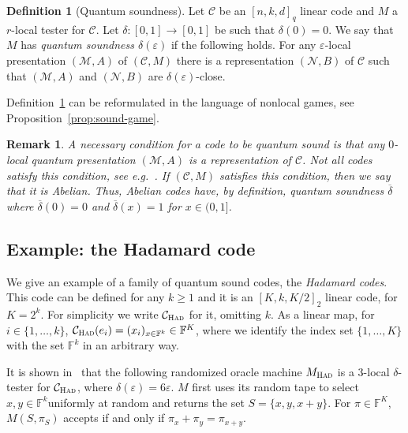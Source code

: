 \documentclass[11pt]{article}
\newtheorem{remark}[theorem]{Remark}
\theoremstyle{definition}
\newtheorem{definition}[theorem]{Definition}
\newcommand{\code}{\mathcal{C}}
\DeclareMathOperator*{\Expectation}{\mathbb{E}}
\newcommand{\Es}[1]{\Expectation_{#1}}
\newcommand{\field}{\mathbb{F}}
\newcommand{\mC}{\ensuremath{\mathcal{C}}}
\newcommand{\mM}{\ensuremath{\mathcal{M}}}
\newcommand{\had}{\textsc{Had}}
\newcommand{\eps}{\varepsilon}
\newcommand{\mN}{\mathcal{N}}
\begin{document}
\begin{definition}[Quantum soundness]\label{def:q-sound}
Let $\code$ be an $[n,k,d]_q$ linear code and $M$ a $r$-local tester for $\code$. Let $\delta:[0,1]\to[0,1]$ be such that $\delta(0)=0$. We say that $M$ has \emph{quantum soundness $\delta(\eps)$} if the following holds. For any $\eps$-local presentation $(\mM,A)$ of $(\code,M)$
there is a representation $(\mN,B)$ of $\code$ such that $(\mM,A)$ and $(\mN,B)$ are $\delta(\eps)$-close. 
\end{definition}

Definition~\ref{def:q-sound} can be reformulated in the language of nonlocal games, see Proposition~\ref{prop:sound-game}. 

\begin{remark}
A necessary condition for a code to be quantum sound is that any $0$-local quantum presentation $(\mM,A)$ is  a representation of $\mC$. Not all codes satisfy this condition, see e.g.~\cite[Example 2.16]{paddock2022arkhipov}. If $(\mC,M)$ satisfies this condition, then we say that it is \emph{Abelian}. Thus, Abelian codes have, by definition, quantum soundness $\overline{\delta}$ where $\overline{\delta}(0)=0$ and $\overline{\delta}(x)=1$ for $x\in(0,1]$. 
\end{remark}


		
		
\subsection{Example: the Hadamard code}

We give an example of a family of quantum sound codes, the \emph{Hadamard codes}. This code can be defined for any  $k\geq 1$ and it is an $[K,k,K/2]_2$ linear code, for $K=2^k$. For simplicity we write  $\code_\had$ for it, omitting $k$. As a linear map, for $i\in\{1,\ldots,k\}$, $\code_\had(e_i) = (x_i)_{x\in \field^k} \in \field^K$, where we identify the index set $\{1,\ldots,K\}$ with the set $\field^k$ in an arbitrary way.  

It is shown in~\cite{blum1990self} that the following randomized oracle machine $M_\had$ is a $3$-local $\delta$-tester for $\code_\had$, where $\delta(\eps)=6\eps$. $M$ first uses its random tape to select $x,y\in\field^k$uniformly at random and returns the set $S=\{x,y,x+y\}$. For $\pi\in \field^K$, $M(S,\pi_S)$ accepts if and only if $\pi_x + \pi_y  = \pi_{x+y}$. 
\end{document}
